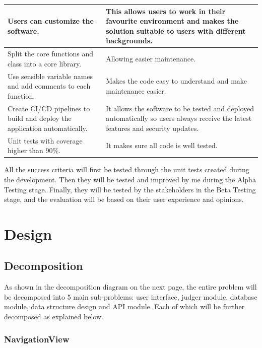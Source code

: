 \documentclass[a4paper]{report}
\begin{document}
\begin{tabulary}{\linewidth}{|L|L|}
    \hline
    Users can customize the software. & This allows users to work in their favourite environment and makes the solution suitable to users with different backgrounds.\\
    \hline
    Split the core functions and class into a core library. & Allowing easier maintenance. \\
    \hline
    Use sensible variable names and add comments to each function. & Makes the code easy to understand and make maintenance easier.\\
    \hline
    Create CI/CD pipelines to build and deploy the application automatically. & It allows the software to be tested and deployed automatically so users always receive the latest features and security updates.\\
    \hline
    Unit tests with coverage higher than 90\%. & It makes sure all code is well tested. \\
    \hline
\end{tabulary}

All the success criteria will first be tested through the unit tests created during the development. Then they will be tested and improved by me during the Alpha Testing stage. Finally, they will be tested by the stakeholders in the Beta Testing stage, and the evaluation will be based on their user experience and opinions.

\chapter{Design}
\section{Decomposition}

As shown in the decomposition diagram on the next page, the entire problem will be decomposed into 5 main sub-problems: user interface, judger module, database module, data structure design and API module. Each of which will be further decomposed as explained below.



\subsection{NavigationView}
\label{sec:NavigationViewDesign}
\end{document}

